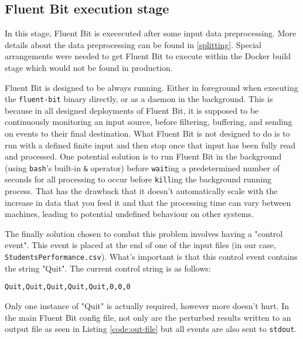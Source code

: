 \subsection{Fluent Bit execution stage}
In this stage, Fluent Bit is exececuted after some input data preprocessing. More details about the data preprocessing can be found in \ref{splitting}. Special arrangements were needed to get Fluent Bit to execute within the Docker build stage which would not be found in production.

Fluent Bit is designed to be always running. Either in foreground when executing the \texttt{fluent-bit} binary directly, or as a \Gls{daemon} in the background. This is because in all designed deployments of Fluent Bit, it is supposed to be continuously monitoring an input source, before filtering, buffering, and sending on \glspl{event} to their final destination. What Fluent Bit is not designed to do is to run with a defined finite input and then stop once that input has been fully read and processed. One potential solution is to run Fluent Bit in the background (using \texttt{bash}'s built-in \texttt{\&} operator) before \texttt{wait}ing a predetermined number of seconds for all processing to occur before \texttt{kill}ing the background running process. That has the drawback that it doesn't automatically scale with the increase in data that you feed it and that the processing time can vary between machines, leading to potential undefined behaviour on other systems. 

The finally solution chosen to combat this problem involves having a "control event". This event is placed at the end of one of the input files (in our case, \texttt{StudentsPerformance.csv}). What's important is that this control event contains the string "Quit". The current control string is as follows:

\begin{lstlisting}[caption={Quit Control code line}]
Quit,Quit,Quit,Quit,Quit,0,0,0
\end{lstlisting}

Only one instance of "Quit" is actually required, however more doesn't hurt. In the main Fluent Bit config file, not only are the perturbed results written to an output file as seen in Listing \ref{code:out-file} but all events are also sent to \texttt{stdout}.



